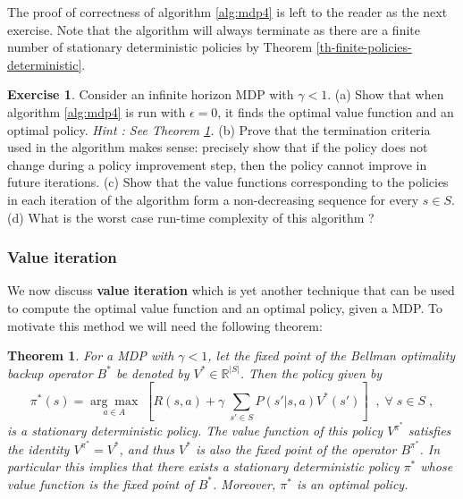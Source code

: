 \documentclass{article}
\newtheorem{theorem}{Theorem}[section]
\theoremstyle{definition}
\newtheorem{exercise}{Exercise}[section]
\theoremstyle{remark}
\begin{document}
The proof of correctness of algorithm \ref{alg:mdp4} is left to the reader as the next exercise. Note that the algorithm will always terminate as there are a finite number of stationary deterministic policies by Theorem \ref{th-finite-policies-deterministic}.

\begin{exercise}
Consider an infinite horizon MDP with $\gamma < 1$. (a) Show that when algorithm \ref{alg:mdp4} is run with $\epsilon=0$, it finds the optimal value function and an optimal policy. \textit{Hint : See Theorem \ref{th-fixed-point-bellman-opt-backup}.} (b) Prove that the termination criteria used in the algorithm makes sense: precisely show that if the policy does not change during a policy improvement step, then the policy cannot improve in future iterations. (c) Show that the value functions corresponding to the policies in each iteration of the algorithm form a non-decreasing sequence for every $s \in S$. (d) What is the worst case run-time complexity of this algorithm ?
\label{ex-policy-iteration}
\end{exercise}

\subsubsection{Value iteration}
We now discuss \textbf{value iteration} which is yet another technique that can be used to compute the optimal value function and an optimal policy, given a MDP. To motivate this method we will need the following theorem:

\begin{theorem}
For a MDP with $\gamma < 1$, let the fixed point of the Bellman optimality backup operator $B^{\ast}$ be denoted by $V^{\ast} \in \mathbb{R}^{|S|}$. Then the policy given by 
\begin{equation}
\pi^{\ast}(s) = \underset{a \in A}{\arg\max} \; \left[ R(s,a) + \gamma \; \sum_{s' \in S} P(s'|s,a) V^{\ast}(s') \right]  \;\;,\; \forall \; s \in S \;,
\label{eq:fixed-point-bellman-opt-backup-theorem-eq1}
\end{equation}
is a stationary deterministic policy. The value function of this policy $V^{\pi^{\ast}}$ satisfies the identity $V^{\pi^{\ast}} = V^{\ast}$, and thus $V^{\ast}$ is also the fixed point of the operator $B^{\pi^{\ast}}$. In particular this implies that there exists a stationary deterministic policy $\pi^{\ast}$ whose value function is the fixed point of $B^{\ast}$. Moreover, $\pi^{\ast}$ is an optimal policy.
\label{th-fixed-point-bellman-opt-backup}
\end{theorem}
\end{document}
